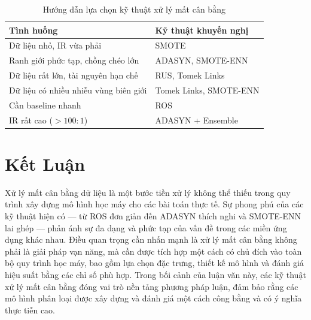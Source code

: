 \begin{table}[h]
\centering
\caption{Hướng dẫn lựa chọn kỹ thuật xử lý mất cân bằng}
\label{tab:guide}
\renewcommand{\arraystretch}{1.35}
\begin{tabularx}{\textwidth}{lX}
\toprule
\textbf{Tình huống} & \textbf{Kỹ thuật khuyến nghị} \\
\midrule
Dữ liệu nhỏ, IR vừa phải                  & SMOTE \\
Ranh giới phức tạp, chồng chéo lớn        & ADASYN, SMOTE-ENN \\
Dữ liệu rất lớn, tài nguyên hạn chế       & RUS, Tomek Links \\
Dữ liệu có nhiều nhiễu vùng biên giới     & Tomek Links, SMOTE-ENN \\
Cần baseline nhanh                         & ROS \\
IR rất cao ($> 100:1$)                     & ADASYN + Ensemble \\
\bottomrule
\end{tabularx}
\end{table}

\section{Kết Luận}

Xử lý mất cân bằng dữ liệu là một bước tiền xử lý không thể thiếu trong quy trình xây dựng mô hình học máy cho các bài toán thực tế. Sự phong phú của các kỹ thuật hiện có --- từ ROS đơn giản đến ADASYN thích nghi và SMOTE-ENN lai ghép --- phản ánh sự đa dạng và phức tạp của vấn đề trong các miền ứng dụng khác nhau. Điều quan trọng cần nhấn mạnh là xử lý mất cân bằng không phải là giải pháp vạn năng, mà cần được tích hợp một cách có chủ đích vào toàn bộ quy trình học máy, bao gồm lựa chọn đặc trưng, thiết kế mô hình và đánh giá hiệu suất bằng các chỉ số phù hợp. Trong bối cảnh của luận văn này, các kỹ thuật xử lý mất cân bằng đóng vai trò nền tảng phương pháp luận, đảm bảo rằng các mô hình phân loại được xây dựng và đánh giá một cách công bằng và có ý nghĩa thực tiễn cao.
